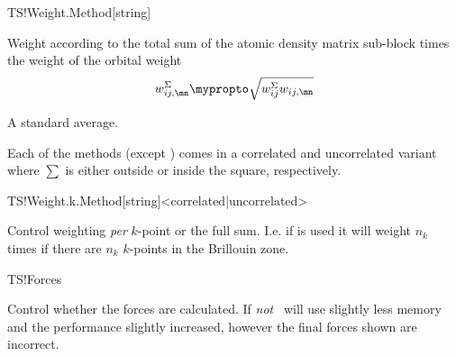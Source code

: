 \begin{fdfentry}{TS!Weight.Method}[string]
\begin{fdfoptions}
    
    Weight according to the total sum of the atomic density matrix
    sub-block times the weight of the orbital weight
    \begin{equation}
      w_{ij,\mn}^{\Sigma} \mypropto
      \sqrt{
          w_{ij}^{\Sigma} 
          w_{ij,\mn}
      }
    \end{equation}

    \option[mean]%
    
    A standard average.
    
  \end{fdfoptions}


  Each of the methods (except ) comes in a correlated and
  uncorrelated variant where $\sum$ is either outside or inside the
  square, respectively.

\end{fdfentry}

\begin{fdfentry}{TS!Weight.k.Method}[string]<correlated|uncorrelated>

  Control weighting \emph{per} $k$-point or the full sum. I.e. if
   is used it will weight $n_k$ times if there are
  $n_k$ $k$-points in the Brillouin zone.
  
\end{fdfentry}

\begin{fdflogicalT}{TS!Forces}
  
  Control whether the forces are calculated. If \emph{not} \tsiesta\
  will use slightly less memory and the performance slightly
  increased, however the final forces shown are incorrect.

\end{fdflogicalT}

